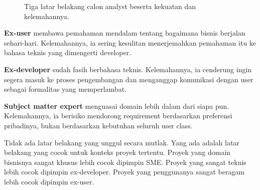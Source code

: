 \documentclass[11pt,a4paper]{article}
\begin{document}
\begin{figure}[H]
	\centering
	\caption{Tiga latar belakang calon analyst beserta kekuatan dan kelemahannya.}
	\label{fig:backgrounds}
\end{figure}

\textbf{Ex-user} membawa pemahaman mendalam tentang bagaimana bisnis berjalan sehari-hari. Kelemahannya, ia sering kesulitan menerjemahkan pemahaman itu ke bahasa teknis yang dimengerti developer.

\textbf{Ex-developer} sudah fasih berbahasa teknis. Kelemahannya, ia cenderung ingin segera masuk ke proses pengembangan dan menganggap komunikasi dengan user sebagai formalitas yang memperlambat.

\textbf{Subject matter expert} menguasai domain lebih dalam dari siapa pun. Kelemahannya, ia berisiko mendorong requirement berdasarkan preferensi pribadinya, bukan berdasarkan kebutuhan seluruh user class.

Tidak ada latar belakang yang unggul secara mutlak. Yang ada adalah latar belakang yang cocok untuk konteks proyek tertentu. Proyek yang domain bisnisnya sangat khusus lebih cocok dipimpin SME. Proyek yang sangat teknis lebih cocok dipimpin ex-developer. Proyek yang penggunanya sangat beragam lebih cocok dipimpin ex-user.
\end{document}
